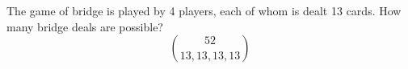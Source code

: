\item The game of bridge is played by 4 players, each of whom is dealt 13 cards. How many bridge deals are possible?
\[ \binom{52}{13,13,13,13} \]